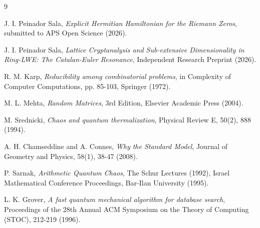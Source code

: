 \documentclass[sn-mathphys]{sn-jnl}
\begin{document}
\begin{thebibliography}{9}

J. I. Peinador Sala, \textit{Explicit Hermitian Hamiltonian for the Riemann Zeros}, submitted to APS Open Science (2026).

J. I. Peinador Sala, \textit{Lattice Cryptanalysis and Sub-extensive Dimensionality in Ring-LWE: The Catalan-Euler Resonance}, Independent Research Preprint (2026).

R. M. Karp, \textit{Reducibility among combinatorial problems}, in Complexity of Computer Computations, pp. 85-103, Springer (1972).

M. L. Mehta, \textit{Random Matrices}, 3rd Edition, Elsevier Academic Press (2004).

M. Srednicki, \textit{Chaos and quantum thermalization}, Physical Review E, 50(2), 888 (1994).

A. H. Chamseddine and A. Connes, \textit{Why the Standard Model}, Journal of Geometry and Physics, 58(1), 38-47 (2008).

P. Sarnak, \textit{Arithmetic Quantum Chaos}, The Schur Lectures (1992), Israel Mathematical Conference Proceedings, Bar-Ilan University (1995).

L. K. Grover, \textit{A fast quantum mechanical algorithm for database search}, Proceedings of the 28th Annual ACM Symposium on the Theory of Computing (STOC), 212-219 (1996).

\end{thebibliography}
\end{document}
